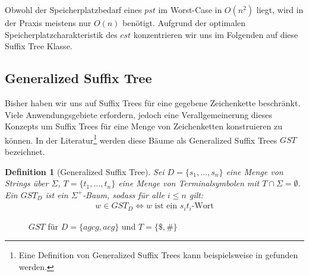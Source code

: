 \documentclass[12pt]{report}
\newtheorem{definition}{Definition}
\begin{document}
Obwohl der Speicherplatzbedarf eines $pst$ im Worst-Case in $O(n^2)$ liegt, wird in der Praxis meistens nur $O(n)$ benötigt.
Aufgrund der optimalen Speicherplatzcharakteristik des $cst$ konzentrieren wir uns im Folgenden auf diese Suffix Tree Klasse.

\subsection{Generalized Suffix Tree}
\label{sec:GeneralizedSuffixTree}

Bisher haben wir uns auf Suffix Trees für eine gegebene Zeichenkette beschränkt. Viele Anwendungsgebiete erfordern, jedoch eine Verallgemeinerung dieses Konzepts um Suffix Trees für eine Menge von Zeichenketten konstruieren zu können. In der Literatur\footnote{Eine Definition von Generalized Suffix Trees kann beispielsweise in \cite{Gusfield1997} gefunden werden.} werden diese Bäume als Generalized Suffix Trees $GST$ bezeichnet.

\begin{definition}[Generalized Suffix Tree]
Sei $D = \{s_1, \dots, s_n\}$ eine Menge von Strings über $\Sigma$, $T = \{t_1, \dots, t_n\}$ eine Menge von Terminalsymbolen mit $T \cap \Sigma = \emptyset$. Ein $GST_D$ ist ein $\Sigma^+$-Baum, sodass für alle $i \leq n$ gilt:
\begin{gather*}
    w \in GST_D \Longleftrightarrow w \text{ ist ein } s_it_i\text{-Wort}
\end{gather*}
\label{def:GeneralizedSuffixTree}
\end{definition}

\begin{figure}[htb]
\centering
{}
\caption{$GST$ für $D = \{agcg, acg\}$ und $T = \{\$, \#\}$}
\label{fig:GSTAgcgAcg}
\end{figure}
\end{document}
